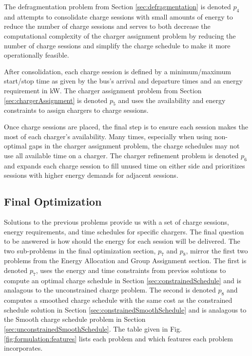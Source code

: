 \par The defragmentation problem from Section \ref{sec:defragmentation} is denoted $p_4$ and attempts to consolidate charge sessions with small amounts of energy to reduce the number of charge sessions and serves to both decrease the computational complexity of the charger assignment problem by reducing the number of charge sessions and simplify the charge schedule to make it more operationally feasible.  
\par After consolidation, each charge session is defined by a minimum/maximum start/stop time as given by the bus's arrival and departure times and an energy requirement in kW. The charger assignment problem from Section \ref{sec:chargerAssignment} is denoted $p_5$ and uses the availability and energy constraints to assign chargers to charge sessions.  
\par Once charge sessions are placed, the final step is to ensure each session makes the most of each charger's availability. Many times, especially when using non-optimal gaps in the charger assignment problem, the charge schedules may not use all available time on a charger. The charger refinement problem is denoted $p_6$ and expands each charge session to fill unused time on either side and prioritizes sessions with higher energy demands for adjacent sessions.  

\subsection{Final Optimization} 
Solutions to the previous problems provide us with a set of charge sessions, energy requirements, and time schedules for specific chargers. The final question to be answered is how should the energy for each session will be delivered. The two sub-problems in the final optimization section, $p_7$ and $p_8$, mirror the first two problems from the Energy Allocation and Group Assignment section. The first is denoted $p_7$, uses the energy and time constraints from previos solutions to compute an optimal charge schedule in Section \ref{sec:constrainedSchedule} and is analagous to the unconstrained charge problem. The second is denoted $p_8$ and computes a smoothed charge schedule with the same cost as the constrained schedule solution in Section \ref{sec:constrainedSmoothSchedule} and is analagous to the Smooth charge schedule problem in Section \ref{sec:unconstrainedSmoothSchedule}. The table given in Fig. \ref{fig:formulation:features} lists each problem and which features each problem incorporates.

 
 
 


